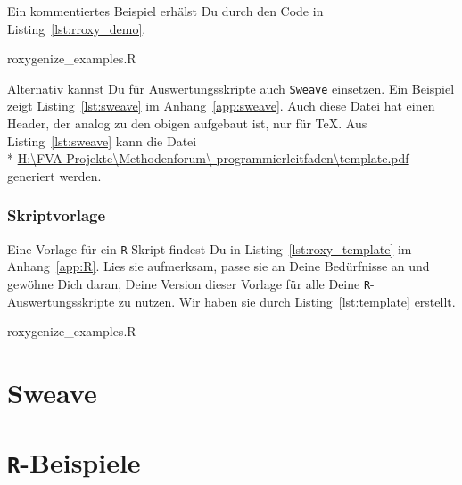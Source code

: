 \documentclass[twoside]{scrartcl}
\providecommand{\R}{\texttt{R}}
\providecommand{\code}[1]{\texttt{#1}}
\providecommand{\proot}{%
H:\textbackslash{}FVA-Projekte\textbackslash{}Methodenforum\textbackslash{}%
}
\providecommand{\pdir}{\proot{}programmierleitfaden\textbackslash{}}
\begin{document}
Ein kommentiertes Beispiel erh\"a{}lst Du
durch den Code in Listing~\ref{lst:rroxy_demo}. 

{roxygenize_examples.R}

 Alternativ kannst Du f\"u{}r 
Auswertungsskripte auch
\href{http://www.stat.uni-muenchen.de/~leisch/Sweave/}{\code{Sweave}} einsetzen.
Ein Beispiel zeigt Listing~\ref{lst:sweave} im
Anhang~\ref{app:sweave}.
Auch diese Datei hat einen Header, der analog zu den obigen aufgebaut ist, nur
f\"u{}r \TeX{}.
Aus  Listing~\ref{lst:sweave} kann die Datei \\* 
\href{%
template.pdf}{%
\pdir{}template.pdf}  
generiert werden.

\subsubsection{Skriptvorlage
 }
Eine Vorlage f\"ur ein \R{}-Skript findest Du in Listing~\ref{lst:roxy_template}
im Anhang~\ref{app:R}. 
Lies sie aufmerksam, passe sie an Deine Bed\"u{}rfnisse an und gew\"o{}hne Dich
daran, Deine Version dieser Vorlage f\"u{}r alle Deine \R{}-Auswertungsskripte
zu nutzen.
Wir haben sie durch Listing~\ref{lst:template} erstellt.

{roxygenize_examples.R}




\printindex
\appendix
\section{Sweave\label{app:sweave}}

\pagebreak
\section{\R{}-Beispiele\label{app:R}}

%
%
%
\end{document}
